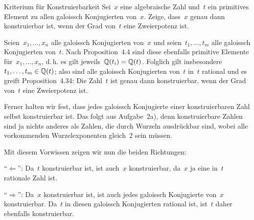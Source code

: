 \documentclass{algblatt}
\begin{document}
\begin{aufgabe}{Kriterium für Konstruierbarkeit}
Sei~$x$ eine algebraische Zahl und~$t$ ein primitives Element zu allen galoissch
Konjugierten von~$x$. Zeige, dass~$x$ genau dann konstruierbar ist, wenn der
Grad von~$t$ eine Zweierpotenz ist.

\begin{loesung}
Seien~$x_1,\ldots,x_n$ alle galoissch Konjugierten von~$x$ und
seien~$t_1,\ldots,t_m$ alle galoissch Konjugierten von~$t$. Nach
Proposition~4.4 sind diese ebenfalls primitive Elemente für~$x_1,\ldots,x_n$,
d.\,h. es gilt jeweils~$\mathbb{Q}(t_i) = \mathbb{Q}(t)$. Folglich gilt
insbesondere~$t_1,\ldots,t_m \in \mathbb{Q}(t)$; also sind alle galoissch Konjugierten
von~$t$ in~$t$ rational und es greift Proposition~4.34: Die Zahl~$t$ ist genau
dann konstruierbar, wenn der Grad von~$t$ eine Zweierpotenz ist.

Ferner halten wir fest, dass jedes galoissch Konjugierte einer konstruierbaren
Zahl selbst konstruierbar ist. Das folgt aus Aufgabe~2a), denn konstruierbare
Zahlen sind ja nichts anderes als Zahlen, die durch Wurzeln ausdrückbar sind,
wobei alle vorkommenden Wurzelexponenten gleich~$2$ sein müssen.

Mit diesem Vorwissen zeigen wir nun die beiden Richtungen:

"`$\Longleftarrow$"': Da~$t$ konstruierbar ist, ist auch~$x$
konstruierbar, da~$x$ ja eine in~$t$ rationale Zahl ist.

"`$\Longrightarrow$"': Da~$x$ konstruierbar ist, ist auch jedes galoissch
Konjugierte von~$x$ konstruierbar. Da~$t$ in diesen galoissch Konjugierten
rational ist, ist~$t$ daher ebenfalls konstruierbar.
\end{loesung}
\end{aufgabe}
\end{document}
